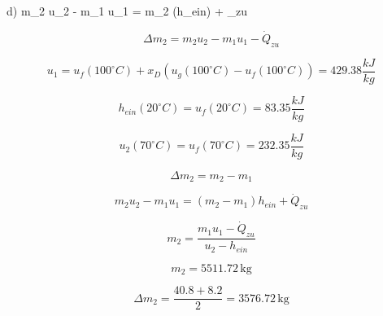 d) \quad m_2 u_2 - m_1 u_1 = \Delta m_2 (h_{ein}) + _{zu} \quad {}

\[
\Delta m_2 = m_2 u_2 - m_1 u_1 - \dot{Q}_{zu}
\]

\[
u_1 = u_f (100^\circ C) + x_D (u_g (100^\circ C) - u_f (100^\circ C)) = 429.38 \frac{kJ}{kg}
\]

\[
h_{ein} (20^\circ C) = u_f (20^\circ C) = 83.35 \frac{kJ}{kg}
\]

\[
u_2 (70^\circ C) = u_f (70^\circ C) = 232.35 \frac{kJ}{kg}
\]

\[
\Delta m_2 = m_2 - m_1
\]

\[
m_2 u_2 - m_1 u_1 = (m_2 - m_1) h_{ein} + \dot{Q}_{zu}
\]

\[
m_2 = \frac{m_1 u_1 - \dot{Q}_{zu}}{u_2 - h_{ein}}
\]

\[
m_2 = 5511.72 \, \text{kg}
\]

\[
\Delta m_2 = \frac{40.8 + 8.2}{2} = 3576.72 \, \text{kg}
\]